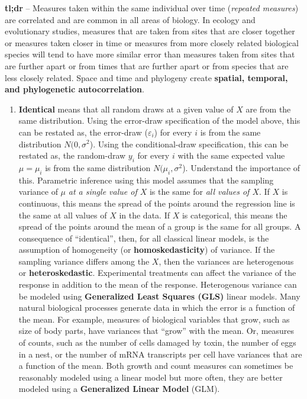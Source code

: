 \documentclass[]{book}
\providecommand{\tightlist}{%
  \setlength{\itemsep}{0pt}\setlength{\parskip}{0pt}}
\begin{document}
\textbf{tl;dr} -- Measures taken within the same individual over time (\emph{repeated measures}) are correlated and are common in all areas of biology. In ecology and evolutionary studies, measures that are taken from sites that are closer together or measures taken closer in time or measures from more closely related biological species will tend to have more similar error than measures taken from sites that are further apart or from times that are further apart or from species that are less closely related. Space and time and phylogeny create \textbf{spatial, temporal, and phylogenetic autocorrelation}.

\begin{enumerate}
\def\labelenumi{\arabic{enumi}.}
\setcounter{enumi}{1}
\tightlist
\item
  \textbf{Identical} means that all random draws at a given value of \(X\) are from the same distribution. Using the error-draw specification of the model above, this can be restated as, the error-draw (\(\varepsilon_i\)) for every \(i\) is from the same distribution \(N(0, \sigma^2\)). Using the conditional-draw specification, this can be restated as, the random-draw \(y_i\) for every \(i\) with the same expected value \(\mu = \mu_i\) is from the same distribution \(N(\mu_i, \sigma^2\)). Understand the importance of this. Parametric inference using this model assumes that the sampling variance of \(\mu\) \emph{at a single value of \(X\)} is the same for \emph{all values of \(X\)}. If \(X\) is continuous, this means the spread of the points around the regression line is the same at all values of \(X\) in the data. If \(X\) is categorical, this means the spread of the points around the mean of a group is the same for all groups. A consequence of ``identical'', then, for all classical linear models, is the assumption of homogeneity (or \textbf{homoskedasticity}) of variance. If the sampling variance differs among the \(X\), then the variances are heterogenous or \textbf{heteroskedastic}. Experimental treatments can affect the variance of the response in addition to the mean of the response. Heterogenous variance can be modeled using \textbf{Generalized Least Squares (GLS)} linear models. Many natural biological processes generate data in which the error is a function of the mean. For example, measures of biological variables that grow, such as size of body parts, have variances that ``grow'' with the mean. Or, measures of counts, such as the number of cells damaged by toxin, the number of eggs in a nest, or the number of mRNA transcripts per cell have variances that are a function of the mean. Both growth and count measures can sometimes be reasonably modeled using a linear model but more often, they are better modeled using a \textbf{Generalized Linear Model} (GLM).
\end{enumerate}
\end{document}
